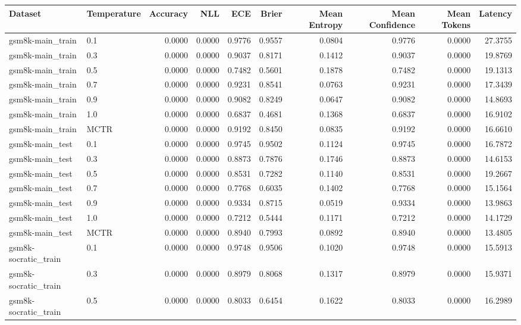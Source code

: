\begin{tabular}{llrrrrrrrr}
\toprule
Dataset & Temperature & Accuracy & NLL & ECE & Brier & Mean Entropy & Mean Confidence & Mean Tokens & Latency \\
\midrule
gsm8k-main_train & 0.1 & 0.0000 & 0.0000 & 0.9776 & 0.9557 & 0.0804 & 0.9776 & 0.0000 & 27.3755 \\
gsm8k-main_train & 0.3 & 0.0000 & 0.0000 & 0.9037 & 0.8171 & 0.1412 & 0.9037 & 0.0000 & 19.8769 \\
gsm8k-main_train & 0.5 & 0.0000 & 0.0000 & 0.7482 & 0.5601 & 0.1878 & 0.7482 & 0.0000 & 19.1313 \\
gsm8k-main_train & 0.7 & 0.0000 & 0.0000 & 0.9231 & 0.8541 & 0.0763 & 0.9231 & 0.0000 & 17.3439 \\
gsm8k-main_train & 0.9 & 0.0000 & 0.0000 & 0.9082 & 0.8249 & 0.0647 & 0.9082 & 0.0000 & 14.8693 \\
gsm8k-main_train & 1.0 & 0.0000 & 0.0000 & 0.6837 & 0.4681 & 0.1368 & 0.6837 & 0.0000 & 16.9102 \\
gsm8k-main_train & MCTR & 0.0000 & 0.0000 & 0.9192 & 0.8450 & 0.0835 & 0.9192 & 0.0000 & 16.6610 \\
gsm8k-main_test & 0.1 & 0.0000 & 0.0000 & 0.9745 & 0.9502 & 0.1124 & 0.9745 & 0.0000 & 16.7872 \\
gsm8k-main_test & 0.3 & 0.0000 & 0.0000 & 0.8873 & 0.7876 & 0.1746 & 0.8873 & 0.0000 & 14.6153 \\
gsm8k-main_test & 0.5 & 0.0000 & 0.0000 & 0.8531 & 0.7282 & 0.1140 & 0.8531 & 0.0000 & 19.2667 \\
gsm8k-main_test & 0.7 & 0.0000 & 0.0000 & 0.7768 & 0.6035 & 0.1402 & 0.7768 & 0.0000 & 15.1564 \\
gsm8k-main_test & 0.9 & 0.0000 & 0.0000 & 0.9334 & 0.8715 & 0.0519 & 0.9334 & 0.0000 & 13.9863 \\
gsm8k-main_test & 1.0 & 0.0000 & 0.0000 & 0.7212 & 0.5444 & 0.1171 & 0.7212 & 0.0000 & 14.1729 \\
gsm8k-main_test & MCTR & 0.0000 & 0.0000 & 0.8940 & 0.7993 & 0.0892 & 0.8940 & 0.0000 & 13.4805 \\
gsm8k-socratic_train & 0.1 & 0.0000 & 0.0000 & 0.9748 & 0.9506 & 0.1020 & 0.9748 & 0.0000 & 15.5913 \\
gsm8k-socratic_train & 0.3 & 0.0000 & 0.0000 & 0.8979 & 0.8068 & 0.1317 & 0.8979 & 0.0000 & 15.9371 \\
gsm8k-socratic_train & 0.5 & 0.0000 & 0.0000 & 0.8033 & 0.6454 & 0.1622 & 0.8033 & 0.0000 & 16.2989 \\

\end{tabular}
